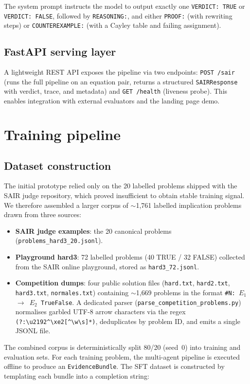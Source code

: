 \documentclass{article}
\begin{document}
The system prompt instructs the model to output exactly one \texttt{VERDICT: TRUE} or \texttt{VERDICT: FALSE}, followed by \texttt{REASONING:}, and either \texttt{PROOF:} (with rewriting steps) or \texttt{COUNTEREXAMPLE:} (with a Cayley table and failing assignment).

\subsection{FastAPI serving layer}

A lightweight REST API exposes the pipeline via two endpoints: \texttt{POST /sair} (runs the full pipeline on an equation pair, returns a structured \texttt{SAIRResponse} with verdict, trace, and metadata) and \texttt{GET /health} (liveness probe). This enables integration with external evaluators and the landing page demo.

\section{Training pipeline}
\label{sec:training}

\subsection{Dataset construction}
\label{sec:dataset}

The initial prototype relied only on the 20 labelled problems shipped with the SAIR judge repository, which proved insufficient to obtain stable training signal. We therefore assembled a larger corpus of $\sim$1{,}761 labelled implication problems drawn from three sources:
\begin{itemize}[itemsep=1pt]
  \item \textbf{SAIR judge examples}: the 20 canonical problems (\texttt{problems\_hard3\_20.jsonl}).
  \item \textbf{Playground hard3}: 72 labelled problems (40 TRUE / 32 FALSE) collected from the SAIR online playground, stored as \texttt{hard3\_72.jsonl}.
  \item \textbf{Competition dumps}: four public solution files (\texttt{hard.txt}, \texttt{hard2.txt}, \texttt{hard3.txt}, \texttt{normales.txt}) containing $\sim$1{,}669 problems in the format \texttt{\#N: $E_1$ $\rightarrow$ $E_2$ True\textbar{}False}. A dedicated parser (\texttt{parse\_competition\_problems.py}) normalises garbled UTF-8 arrow characters via the regex \texttt{(?:\textbackslash u2192\textbar{}\^{}{\textbackslash xe2}[\^{}\textbackslash w\textbackslash s]*)}, deduplicates by problem ID, and emits a single JSONL file.
\end{itemize}
The combined corpus is deterministically split 80/20 (seed~0) into training and evaluation sets. For each training problem, the multi-agent pipeline is executed offline to produce an \texttt{EvidenceBundle}. The SFT dataset is constructed by templating each bundle into a completion string:
\end{document}
